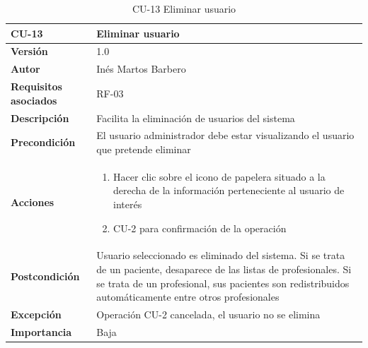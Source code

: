 \begin{table}[p]
	\centering
	\begin{tabularx}{\linewidth}{ p{} p{} }
		\toprule
		\textbf{CU-13}    & \textbf{Eliminar usuario}\\
		\toprule
		\textbf{Versión}              & 1.0    \\
		\textbf{Autor}                & Inés Martos Barbero \\
		\textbf{Requisitos asociados} & RF-03 \\
		\textbf{Descripción}          & Facilita la eliminación de usuarios del sistema \\
		\textbf{Precondición}         & El usuario administrador debe estar visualizando el usuario que pretende eliminar \\
		\textbf{Acciones}             &
		\begin{enumerate}
			\def\labelenumi{\arabic{enumi}.}
			\tightlist
			\item Hacer clic sobre el icono de papelera situado a la derecha de la información perteneciente al usuario de interés
			\item CU-2 para confirmación de la operación
		\end{enumerate}\\
		\textbf{Postcondición}        & Usuario seleccionado es eliminado del sistema. Si se trata de un paciente, desaparece de las listas de profesionales. Si se trata de un profesional, sus pacientes son redistribuidos automáticamente entre otros profesionales \\
		\textbf{Excepción}          & Operación CU-2 cancelada, el usuario no se elimina \\
		\textbf{Importancia}          & Baja \\
		\bottomrule
	\end{tabularx}
	\caption{CU-13 Eliminar usuario}
    \label{CU-13}
\end{table}


